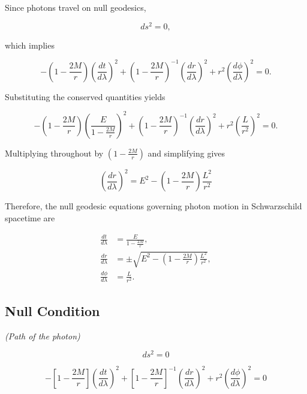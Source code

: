 \documentclass[12pt]{article}
\begin{document}
\begin{itemize}
Since photons travel on null geodesics,

\begin{equation}
ds^2=0,
\end{equation}

which implies

\begin{equation}
-\left(1-\frac{2M}{r}\right)
\left(\frac{dt}{d\lambda}\right)^2
+
\left(1-\frac{2M}{r}\right)^{-1}
\left(\frac{dr}{d\lambda}\right)^2
+
r^2
\left(\frac{d\phi}{d\lambda}\right)^2
=
0.
\end{equation}

Substituting the conserved quantities yields

\begin{equation}
-
\left(1-\frac{2M}{r}\right)
\left(\frac{E}{1-\frac{2M}{r}}\right)^2
+
\left(1-\frac{2M}{r}\right)^{-1}
\left(\frac{dr}{d\lambda}\right)^2
+
r^2
\left(\frac{L}{r^2}\right)^2
=
0.
\end{equation}

Multiplying throughout by $\left(1-\frac{2M}{r}\right)$ and simplifying gives

\begin{equation}
\boxed{
\left(\frac{dr}{d\lambda}\right)^2
=
E^2
-
\left(1-\frac{2M}{r}\right)
\frac{L^2}{r^2}
}
\end{equation}

Therefore, the null geodesic equations governing photon motion in Schwarzschild spacetime are

\begin{align}
\frac{dt}{d\lambda}
&=
\frac{E}{1-\frac{2M}{r}},\\[0.5em]
\frac{dr}{d\lambda}
&=
\pm
\sqrt{
E^2-
\left(1-\frac{2M}{r}\right)
\frac{L^2}{r^2}
},\\[0.5em]
\frac{d\phi}{d\lambda}
&=
\frac{L}{r^2}.
\end{align}
\subsection{Null Condition}

\textit{(Path of the photon)}

\begin{equation}
ds^2 = 0
\end{equation}

\begin{equation}
-\left[1-\frac{2M}{r}\right]
\left(\frac{dt}{d\lambda}\right)^2
+
\left[1-\frac{2M}{r}\right]^{-1}
\left(\frac{dr}{d\lambda}\right)^2
+
r^2
\left(\frac{d\phi}{d\lambda}\right)^2
=0
\end{equation}


\end{itemize}
\end{document}
